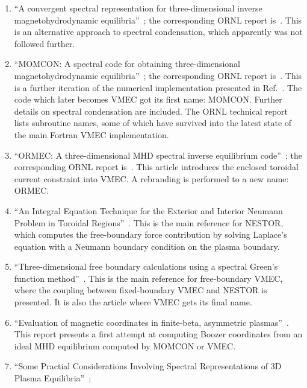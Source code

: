\documentclass[a4paper,11pt]{book}
\begin{document}
\begin{enumerate}
 \item ``A convergent spectral representation for three-dimensional inverse magnetohydrodynamic equilibria''~\cite{hirshman_weitzner_1985};
       the corresponding ORNL report is~\cite{ornl_tm_9302_hirshman_weitzner_1984}.
       This is an alternative approach to spectral condensation,
       which apparently was not followed further.
 \item ``MOMCON: A spectral code for obtaining three-dimensional magnetohydrodynamic equilibria''~\cite{hirshman_lee_1986};
       the corresponding ORNL report is~\cite{ornl_tm_9531_hirshman_lee_1985}.
       This is a further iteration of the numerical implementation presented in Ref.~\cite{hirshman_whitson_1983}.
       The code which later becomes VMEC got its first name: MOMCON.
       Further details on spectral condensation are included.
       The ORNL technical report lists subroutine names,
       some of which have survived into the latest state of the main Fortran VMEC implementation.
 \item ``ORMEC: A three-dimensional MHD spectral inverse equilibrium code''~\cite{hirshman_hogan_1986};
       the corresponding ORNL report is~\cite{ornl_tm_9547_hirshman_hogan_1986}.
       This article introduces the enclosed toroidal current constraint into VMEC.
       A rebranding is performed to a new name: ORMEC.
 \item ``An Integral Equation Technique for the Exterior and Interior Neumann Problem in Toroidal Regions''~\cite{merkel_1986}.
       This is the main reference for NESTOR,
       which computes the free-boundary force contribution by solving Laplace's equation
       with a Neumann boundary condition on the plasma boundary.
 \item ``Three-dimensional free boundary calculations using a spectral Green's function method''~\cite{hirshman_vanrij_merkel_1986}.
       This is the main reference for free-boundary VMEC,
       where the coupling between fixed-boundary VMEC and NESTOR is presented.
       It is also the article where VMEC gets its final name.
 \item ``Evaluation of magnetic coordinates in finite-beta, asymmetric plasmas''~\cite{ornl_tm_10222_beasly_rome_attenberger_hirshman_1987}.
       This report presents a first attempt at computing Boozer coordinates
       from an ideal MHD equilibrium computed by MOMCON or VMEC.
 \item ``Some Practial Considerations Involving Spectral Representations of 3D Plasma Equilibria''~\cite{attenberger_1987};

\end{enumerate}
\end{document}
